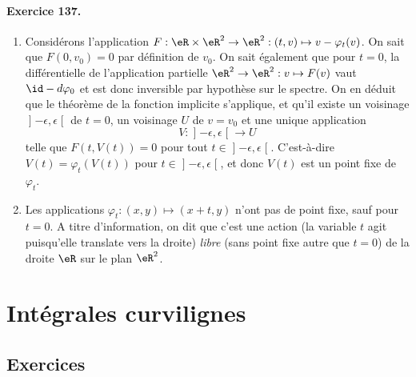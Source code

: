 \paragraph{Exercice 137.}
\begin{enumerate}
\item Considérons l'application $F : \eR\times\eR^2 \to \eR^2 :
(t,v) \mapsto v - \varphi_t(v)$.  On sait que $F(0,v_0) = 0$ par
définition de $v_0$. On sait également que pour $t = 0$, la
différentielle de l'application partielle $\eR^2 \to \eR^2 : v
\mapsto F(v)$ vaut $\id - d\varphi_0$ et est donc inversible par
hypothèse sur le spectre. On en déduit que le théorème de la
fonction implicite s'applique, et qu'il existe un voisinage
$\mathopen\rbrack-\epsilon,\epsilon\mathclose\lbrack$ de $t = 0$, un
voisinage $U$ de $v = v_0$ et une unique application
\begin{equation*}
V : \mathopen\rbrack-\epsilon,\epsilon\mathclose\lbrack \to U
\end{equation*}
telle que $F(t,V(t)) = 0$ pour tout $t \in
\mathopen\rbrack-\epsilon,\epsilon\mathclose\lbrack$. C'est-à-dire
$V(t) = \varphi_t(V(t))$ pour $t \in
\mathopen\rbrack-\epsilon,\epsilon\mathclose\lbrack$, et donc $V(t)$
est un point fixe de $\varphi_t$.

\item Les applications $\varphi_t : (x,y) \mapsto (x+t,y)$ n'ont pas
de point fixe, sauf pour $t = 0$. A titre d'information, on dit que
c'est une action (la variable $t$ \og agit\fg{} puisqu'elle
translate vers la droite) \emph{libre} (sans point fixe autre que $t
= 0$) de la droite $\eR$ sur le plan $\eR^2$.
\end{enumerate}

\section{Intégrales curvilignes}

\subsection{Exercices}
